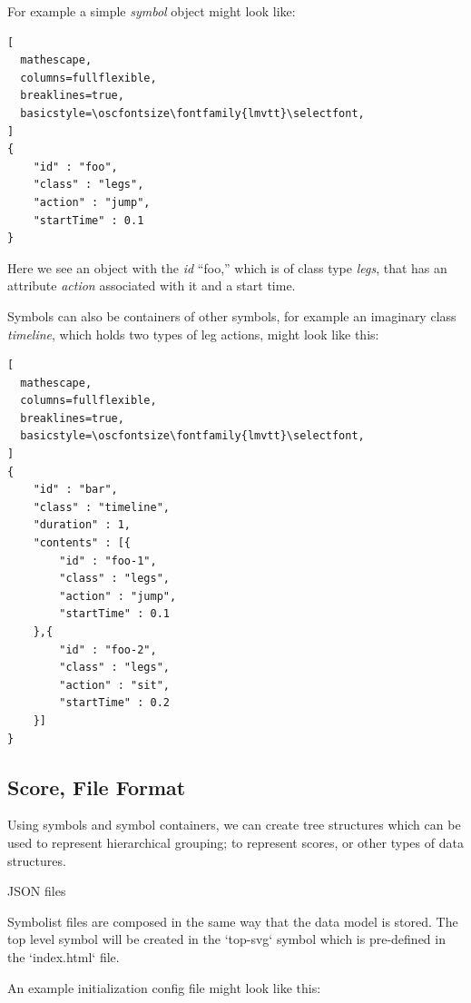 \documentclass{article}
\def\oscfontsize{\footnotesize}
\begin{document}
For example a simple \textit{symbol} object might look like:


\begin{lstlisting}[
  mathescape,
  columns=fullflexible,
  breaklines=true,
  basicstyle=\oscfontsize\fontfamily{lmvtt}\selectfont,
]
{
    "id" : "foo",
    "class" : "legs",
    "action" : "jump",
    "startTime" : 0.1
}
\end{lstlisting}


Here we see an object with the \textit{id} ``foo,'' which is of class type \textit{legs}, that has an attribute \textit{action} associated with it and a start time.

Symbols can also be containers of other symbols, for example an imaginary class \textit{timeline}, which holds two types of leg actions, might look like this:

\begin{lstlisting}[
  mathescape,
  columns=fullflexible,
  breaklines=true,
  basicstyle=\oscfontsize\fontfamily{lmvtt}\selectfont,
]
{
    "id" : "bar",
    "class" : "timeline",
    "duration" : 1,
    "contents" : [{
        "id" : "foo-1",
        "class" : "legs",
        "action" : "jump",
        "startTime" : 0.1
    },{
        "id" : "foo-2",
        "class" : "legs",
        "action" : "sit",
        "startTime" : 0.2
    }]
}

\end{lstlisting}

\subsection{Score, File Format}\label{subsec:file_format}

Using symbols and symbol containers, we can create tree structures which can be used to represent hierarchical grouping; to represent scores, or other types of data structures.

JSON files


Symbolist files are composed in the same way that the data model is stored. The top level symbol will be created in the `top-svg` symbol which is pre-defined in the `index.html` file.

An example initialization config file might look like this:
\end{document}
